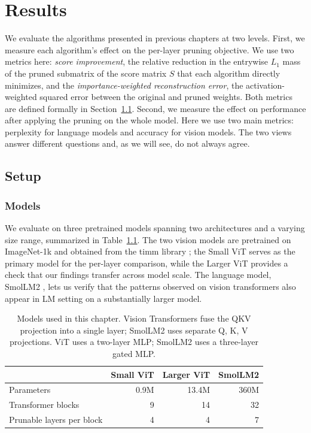 \chapter{Results}
\label{chap:results}


We evaluate the algorithms presented in previous chapters at two levels. First, we measure each algorithm's effect on the per-layer pruning objective. We use two metrics here: \emph{score improvement}, the relative reduction in the entrywise $L_1$ mass of the pruned submatrix of the score matrix $S$ that each algorithm directly minimizes, and the \emph{importance-weighted reconstruction error}, the activation-weighted squared error between the original and pruned weights. Both metrics are defined formally in Section~\ref{sec:setup}. Second, we measure the effect on performance after applying the pruning on the whole model. Here we use two main metrics: perplexity for language models and accuracy for vision models. The two views answer different questions and, as we will see, do not always agree.


\section{Setup}
\label{sec:setup}

\subsection*{Models}

We evaluate on three pretrained models spanning two architectures and a varying size range, summarized in Table~\ref{tab:models}. The two vision models are pretrained on ImageNet-1k \cite{imagenet15russakovsky} and obtained from the timm library \cite{rw2019timm, darcet2023vision, dosovitskiy2020vit}; the Small ViT serves as the primary model for the per-layer comparison, while the Larger ViT provides a check that our findings transfer across model scale. The language model, SmolLM2 \cite{allal2025smollm2smolgoesbig}, lets us verify that the patterns observed on vision transformers also appear in LM setting on a substantially larger model.

\begin{table}[htbp]
    \centering
    \caption{Models used in this chapter. Vision Transformers fuse the QKV projection into a single layer; SmolLM2 uses separate Q, K, V projections. ViT uses a two-layer MLP; SmolLM2 uses a three-layer gated MLP.}
    \label{tab:models}
    \begin{tabular}{l r r r}
        \toprule
                                  & Small ViT & Larger ViT & SmolLM2 \\
        \midrule
        Parameters                & 0.9M      & 13.4M      & 360M    \\
        Transformer blocks        & 9         & 14         & 32      \\
        Prunable layers per block & 4         & 4          & 7       \\
        \bottomrule
    \end{tabular}
\end{table}

